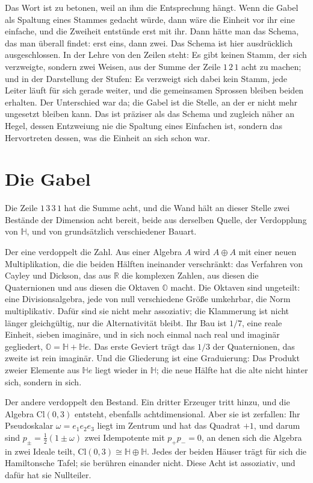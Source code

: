 \documentclass[11pt,a4paper]{article}
\newcommand{\R}{\mathbb R}
\newcommand{\HH}{\mathbb H}
\newcommand{\Oc}{\mathbb O}
\newcommand{\Cl}{\mathrm{Cl}}
\begin{document}
Das Wort ist zu betonen, weil an ihm die Entsprechung hängt. Wenn die Gabel als Spaltung eines Stammes gedacht würde, dann wäre die Einheit vor ihr eine einfache, und die Zweiheit entstünde erst mit ihr. Dann hätte man das Schema, das man überall findet: erst eins, dann zwei. Das Schema ist hier ausdrücklich ausgeschlossen. In der Lehre von den Zeilen steht: Es gibt keinen Stamm, der sich verzweigte, sondern zwei Weisen, aus der Summe der Zeile $1\,2\,1$ acht zu machen; und in der Darstellung der Stufen: Es verzweigt sich dabei kein Stamm, jede Leiter läuft für sich gerade weiter, und die gemeinsamen Sprossen bleiben beiden erhalten. Der Unterschied war da; die Gabel ist die Stelle, an der er nicht mehr ungesetzt bleiben kann. Das ist präziser als das Schema und zugleich näher an Hegel, dessen Entzweiung nie die Spaltung eines Einfachen ist, sondern das Hervortreten dessen, was die Einheit an sich schon war.

\section{Die Gabel}
\label{sec:gabel}

Die Zeile $1\,3\,3\,1$ hat die Summe acht, und die Wand hält an dieser Stelle zwei Bestände der Dimension acht bereit, beide aus derselben Quelle, der Verdopplung von $\HH$, und von grundsätzlich verschiedener Bauart.

Der eine verdoppelt die Zahl. Aus einer Algebra $A$ wird $A\oplus A$ mit einer neuen Multiplikation, die die beiden Hälften ineinander verschränkt: das Verfahren von Cayley und Dickson, das aus $\R$ die komplexen Zahlen, aus diesen die Quaternionen und aus diesen die Oktaven $\Oc$ macht. Die Oktaven sind ungeteilt: eine Divisionsalgebra, jede von null verschiedene Größe umkehrbar, die Norm multiplikativ. Dafür sind sie nicht mehr assoziativ; die Klammerung ist nicht länger gleichgültig, nur die Alternativität bleibt. Ihr Bau ist $1/7$, eine reale Einheit, sieben imaginäre, und in sich noch einmal nach real und imaginär gegliedert, $\Oc=\HH+\HH e$. Das erste Geviert trägt das $1/3$ der Quaternionen, das zweite ist rein imaginär. Und die Gliederung ist eine Graduierung: Das Produkt zweier Elemente aus $\HH e$ liegt wieder in $\HH$; die neue Hälfte hat die alte nicht hinter sich, sondern in sich.

Der andere verdoppelt den Bestand. Ein dritter Erzeuger tritt hinzu, und die Algebra $\Cl(0,3)$ entsteht, ebenfalls achtdimensional. Aber sie ist zerfallen: Ihr Pseudoskalar $\omega=e_1e_2e_3$ liegt im Zentrum und hat das Quadrat $+1$, und darum sind $p_\pm=\tfrac12(1\pm\omega)$ zwei Idempotente mit $p_+p_-=0$, an denen sich die Algebra in zwei Ideale teilt, $\Cl(0,3)\cong\HH\oplus\HH$. Jedes der beiden Häuser trägt für sich die Hamiltonsche Tafel; sie berühren einander nicht. Diese Acht ist assoziativ, und dafür hat sie Nullteiler.
\end{document}
